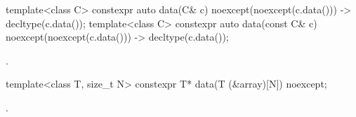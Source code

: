 %
\begin{itemdecl}
template<class C> constexpr auto data(C& c) noexcept(noexcept(c.data())) -> decltype(c.data());
template<class C> constexpr auto data(const C& c) noexcept(noexcept(c.data()))
  -> decltype(c.data());
\end{itemdecl}
\begin{itemdescr}
\pnum
\returns
{}.
\end{itemdescr}

%
\begin{itemdecl}
template<class T, size_t N> constexpr T* data(T (&array)[N]) noexcept;
\end{itemdecl}
\begin{itemdescr}
\pnum
\returns
{}.
\end{itemdescr}
